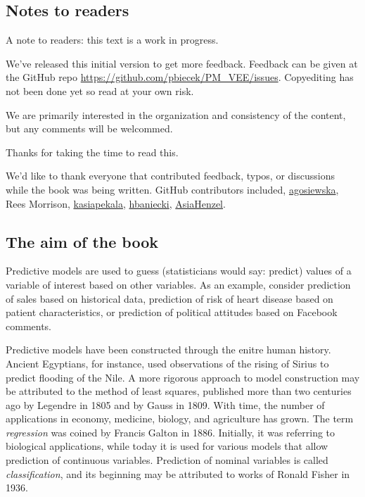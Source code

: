 \documentclass[12pt,]{krantz}
\begin{document}
\hypertarget{notes-to-readers}{%
\subsection{Notes to readers}\label{notes-to-readers}}

A note to readers: this text is a work in progress.

We've released this initial version to get more feedback. Feedback can be given at the GitHub repo \url{https://github.com/pbiecek/PM_VEE/issues}. Copyediting has not been done yet so read at your own risk.

We are primarily interested in the organization and consistency of the content, but any comments will be welcommed.

Thanks for taking the time to read this.

We'd like to thank everyone that contributed feedback, typos, or discussions while the book was being written. GitHub contributors included, \href{https://github.com/agosiewska/}{agosiewska}, Rees Morrison, \href{https://github.com/kasiapekala/}{kasiapekala}, \href{https://github.com/hbaniecki/}{hbaniecki}, \href{https://github.com/AsiaHenzel/}{AsiaHenzel}.

\hypertarget{the-aim-of-the-book}{%
\subsection{The aim of the book}\label{the-aim-of-the-book}}

Predictive models are used to guess (statisticians would say: predict) values of a variable of interest based on other variables. As an example, consider prediction of sales based on historical data, prediction of risk of heart disease based on patient characteristics, or prediction of political attitudes based on Facebook comments.

Predictive models have been constructed through the enitre human history. Ancient Egyptians, for instance, used observations of the rising of Sirius to predict flooding of the Nile. A more rigorous approach to model construction may be attributed to the method of least squares, published more than two centuries ago by Legendre in 1805 and by Gauss in 1809. With time, the number of applications in economy, medicine, biology, and agriculture has grown. The term \emph{regression} was coined by Francis Galton in 1886. Initially, it was referring to biological applications, while today it is used for various models that allow prediction of continuous variables. Prediction of nominal variables is called \emph{classification}, and its beginning may be attributed to works of Ronald Fisher in 1936.
\end{document}
